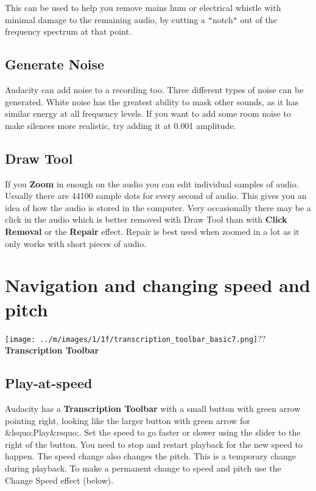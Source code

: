 \documentclass[twocolumn]{book}
\begin{document}
This can be used to help you remove mains hum or electrical whistle with minimal damage to the remaining audio, by cutting a \texttt{{}"{}}notch\texttt{{}"{}} out of the frequency spectrum at that point.

\subsection{Generate Noise}


Audacity can add noise to a recording too. Three different types of noise can be generated. White noise has the greatest ability to mask other sounds, as it has similar energy at all frequency levels. If you want to add some room noise to make silences more realistic, try adding it at 0.001 amplitude.

\subsection{Draw Tool}


If you \textbf{Zoom} in enough on the audio you can edit individual samples of audio. Usually there are 44100 sample dots for every second of audio.  This  gives you an idea of how the audio is stored in the computer.  Very occasionally there may be a click in the audio which is better removed with Draw Tool than with \textbf{Click Removal} or the \textbf{Repair} effect.  Repair is best used when zoomed in a lot as it only works with short pieces of audio.



\section{Navigation and changing speed and pitch}

\texttt{[image: ../m/images/1/1f/transcription\_toolbar\_basic7.png]}??\textbf{Transcription Toolbar}

\subsection{Play-at-speed}


Audacity has a \textbf{Transcription Toolbar} with a small button with green arrow pointing right, looking like the larger button with green arrow for \&lsquo;Play\&rsquo;.  Set the speed to go faster or slower using the slider to the right of the button.  You need to stop and restart playback for the new speed to happen. The speed change also changes the pitch.  This is a temporary change during playback.  To make a permanent change to speed and pitch use the Change Speed effect (below).
\end{document}
